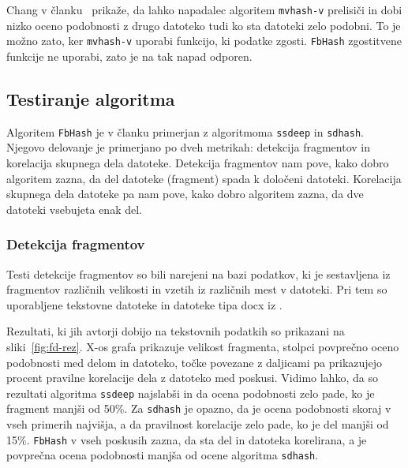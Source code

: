 \documentclass{acm_proc_article-sp}
\begin{document}
Chang v članku~\cite{chang2016security} prikaže, da lahko napadalec algoritem \texttt{mvhash-v} prelisiči in dobi nizko oceno podobnosti z drugo datoteko tudi ko sta datoteki zelo podobni. To je možno zato, ker \texttt{mvhash-v} uporabi funkcijo, ki podatke zgosti. \texttt{FbHash} zgostitvene funkcije ne uporabi, zato je na tak napad odporen.

\subsection{Testiranje algoritma}
Algoritem \texttt{FbHash} je v članku primerjan z algoritmoma \texttt{ssdeep} in \texttt{sdhash}. Njegovo delovanje je primerjano po dveh metrikah: detekcija fragmentov in korelacija skupnega dela datoteke. Detekcija fragmentov nam pove, kako dobro algoritem zazna, da del datoteke (fragment) spada k določeni datoteki. Korelacija skupnega dela datoteke pa nam pove, kako dobro algoritem zazna, da dve datoteki vsebujeta enak del.

\subsubsection{Detekcija fragmentov}

Testi detekcije fragmentov so bili narejeni na bazi podatkov, ki je sestavljena iz fragmentov različnih velikosti in vzetih iz različnih mest v datoteki. Pri tem so uporabljene tekstovne datoteke in datoteke tipa docx iz \cite{dataset}.

Rezultati, ki jih avtorji dobijo na tekstovnih podatkih so prikazani na sliki~\ref{fig:fd-rez}. X-os grafa prikazuje velikost fragmenta, stolpci povprečno oceno podobnosti med delom in datoteko, točke povezane z daljicami pa prikazujejo procent pravilne korelacije dela z datoteko med poskusi. Vidimo lahko, da so rezultati algoritma \texttt{ssdeep} najslabši in da ocena podobnosti zelo pade, ko je fragment manjši od 50\%. Za \texttt{sdhash} je opazno, da je ocena podobnosti skoraj v vseh primerih najvišja, a da pravilnost korelacije zelo pade, ko je del manjši od 15\%. \texttt{FbHash} v vseh poskusih zazna, da sta del in datoteka korelirana, a je povprečna ocena podobnosti manjša od ocene algoritma \texttt{sdhash}.  
\end{document}
